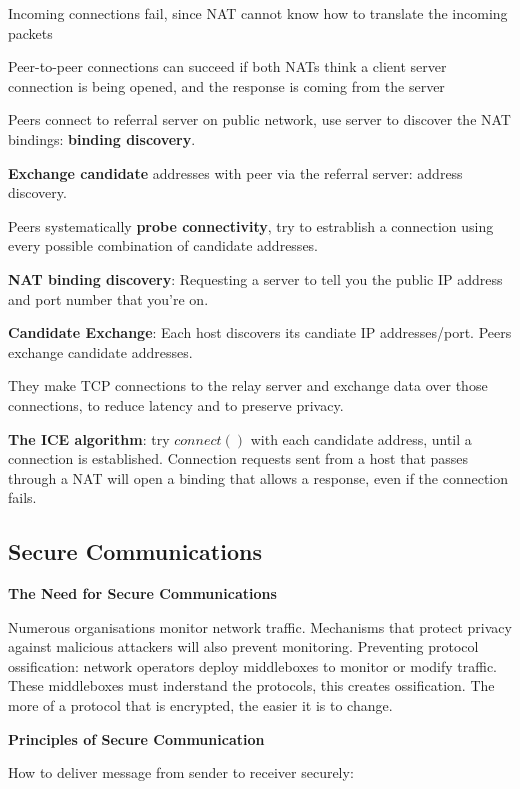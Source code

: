 \documentclass{article}
\begin{document}
Incoming connections fail, since NAT cannot know how to translate the incoming packets

Peer-to-peer connections can succeed if both NATs think a client server connection is being opened, and the response is coming from the server

Peers connect to referral server on public network, use server to discover the NAT bindings: \textbf{binding discovery}.

\textbf{Exchange candidate} addresses with peer via the referral server: address discovery.

Peers systematically \textbf{probe connectivity}, try to estrablish a connection using every possible combination of candidate addresses.

\textbf{NAT binding discovery}: Requesting a server to tell you the public IP address and port number that you're on.

\textbf{Candidate Exchange}: Each host discovers its candiate IP addresses/port. Peers exchange candidate addresses.

They make TCP connections to the relay server and exchange data over those connections, to reduce latency and to preserve privacy.

\textbf{The ICE algorithm}: try $connect()$ with each candidate address, until a connection is established.
Connection requests sent from a host that passes through a NAT will open a binding that allows a response, even if the connection fails.

\clearpage

\subsection*{Secure Communications}

\textbf{The Need for Secure Communications}

Numerous organisations monitor network traffic.
Mechanisms that protect privacy against malicious attackers will also prevent monitoring.
Preventing protocol ossification: network operators deploy middleboxes to monitor or modify traffic.
These middleboxes must inderstand the protocols, this creates ossification.
The more of a protocol that is encrypted, the easier it is to change.

\vspace{\baselineskip}
\textbf{Principles of Secure Communication}

How to deliver message from sender to receiver securely:
\end{document}
